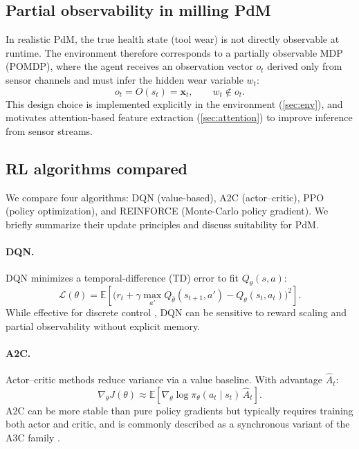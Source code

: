 \documentclass[11pt]{article}
\begin{document}
\subsection{Partial observability in milling PdM}
\label{sec:pomdp}
In realistic PdM, the true health state (tool wear) is not directly observable at runtime. The environment therefore corresponds to a partially observable MDP (POMDP), where the agent receives an observation vector $o_t$ derived only from sensor channels and must infer the hidden wear variable $w_t$:
\begin{equation}
	o_t = O(s_t) = \mathbf{x}_t, \qquad w_t \notin o_t.
\end{equation}
This design choice is implemented explicitly in the environment (\cref{sec:env}), and motivates attention-based feature extraction (\cref{sec:attention}) to improve inference from sensor streams.

\subsection{RL algorithms compared}
\label{sec:algos}
We compare four algorithms: DQN (value-based), A2C (actor--critic), PPO (policy optimization), and REINFORCE (Monte-Carlo policy gradient). We briefly summarize their update principles and discuss suitability for PdM.

\paragraph{DQN.}
DQN minimizes a temporal-difference (TD) error to fit $Q_\theta(s,a)$:
\begin{equation}
	\mathcal{L}(\theta)=\mathbb{E}\left[\big(r_t + \gamma\max_{a'}Q_{\bar\theta}(s_{t+1},a') - Q_\theta(s_t,a_t)\big)^2\right].
\end{equation}
While effective for discrete control \parencite{Mnih2015DQN}, DQN can be sensitive to reward scaling and partial observability without explicit memory.

\paragraph{A2C.}
Actor--critic methods reduce variance via a value baseline. With advantage $\hat{A}_t$:
\begin{equation}
	\nabla_\theta J(\theta) \approx \mathbb{E}[\nabla_\theta \log \pi_\theta(a_t\mid s_t)\,\hat{A}_t].
\end{equation}
A2C can be more stable than pure policy gradients but typically requires training both actor and critic, and is commonly described as a synchronous variant of the A3C family \parencite{Mnih2016A3C}.
\end{document}
